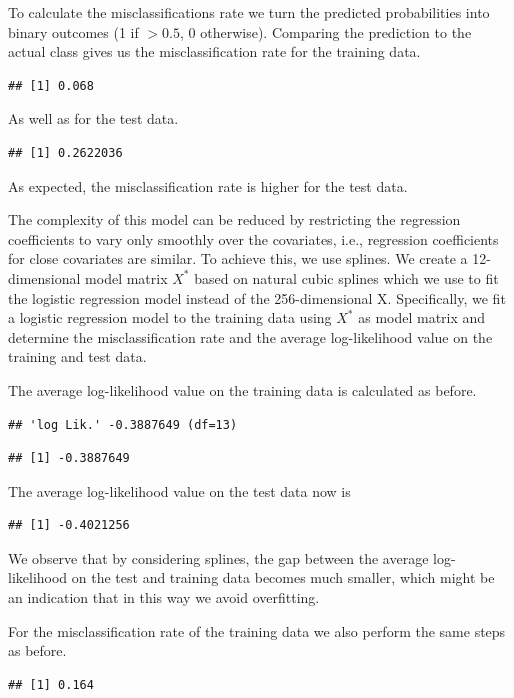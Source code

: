 \documentclass[
]{article}
\begin{document}
To calculate the misclassifications rate we turn the predicted
probabilities into binary outcomes (1 if \(>0.5\), 0 otherwise).
Comparing the prediction to the actual class gives us the
misclassification rate for the training data.

\begin{verbatim}
## [1] 0.068
\end{verbatim}

As well as for the test data.

\begin{verbatim}
## [1] 0.2622036
\end{verbatim}

As expected, the misclassification rate is higher for the test data.

The complexity of this model can be reduced by restricting the
regression coefficients to vary only smoothly over the covariates, i.e.,
regression coefficients for close covariates are similar. To achieve
this, we use splines. We create a 12-dimensional model matrix \(X^*\)
based on natural cubic splines which we use to fit the logistic
regression model instead of the 256-dimensional X. Specifically, we fit
a logistic regression model to the training data using \(X^*\) as model
matrix and determine the misclassification rate and the average
log-likelihood value on the training and test data.

The average log-likelihood value on the training data is calculated as
before.

\begin{verbatim}
## 'log Lik.' -0.3887649 (df=13)
\end{verbatim}

\begin{verbatim}
## [1] -0.3887649
\end{verbatim}

The average log-likelihood value on the test data now is

\begin{verbatim}
## [1] -0.4021256
\end{verbatim}

We observe that by considering splines, the gap between the average
log-likelihood on the test and training data becomes much smaller, which
might be an indication that in this way we avoid overfitting.

For the misclassification rate of the training data we also perform the
same steps as before.

\begin{verbatim}
## [1] 0.164
\end{verbatim}
\end{document}
